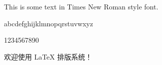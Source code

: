 \documentclass{ctexart}
\begin{document}
This is some text in Times New Roman style font.

abcdefghijklmnopqrstuvwxyz

1234567890

欢迎使用 \LaTeX{} 排版系统！
\end{document}
